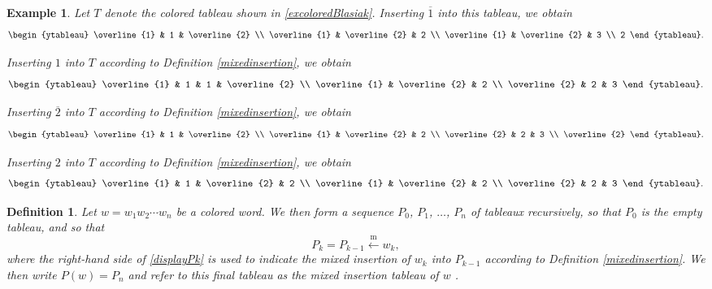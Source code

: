 \documentclass[12pt]{article}
\newtheorem{definition}{Definition}
\newtheorem{example}{Example}
\begin{document}
\begin{example}
 Let $T$ denote the colored tableau shown in \eqref{excoloredBlasiak}. Inserting $\overline{1}$ into this tableau, we obtain 
 $$\begin{ytableau} \overline{1} & 1 & \overline{2} \\ \overline{1} & \overline{2} & 2 \\ \overline{1} & \overline{2} & 3 \\ 2 \end{ytableau}.$$

 Inserting $1$ into $T$ according to Definition \ref{mixedinsertion}, we obtain 
$$\begin{ytableau} \overline{1} & 1 & 1 & \overline{2} \\ \overline{1} & \overline{2} & 2 \\ \overline{2} & 2 & 3 \end{ytableau}.$$

 Inserting $\overline{2}$ 
 into $T$ according to Definition \ref{mixedinsertion}, we obtain 
 $$\begin{ytableau} \overline{1} & 1 & \overline{2} \\ \overline{1} & \overline{2} & 2 \\ \overline{2} & 2 & 3 \\ \overline{2} \end{ytableau}.$$

 Inserting $2$ into $T$ according to Definition \ref{mixedinsertion}, we obtain 
 $$ \begin{ytableau} \overline{1} & 1 & \overline{2} & 2 \\ \overline{1} & \overline{2} & 2 \\ \overline{2} & 2 & 3 \end{ytableau}. $$
\end{example}

\begin{definition}
 Let $w = w_{1} w_{2} \cdots w_{n}$ be a colored word. We then form a sequence $P_{0}$, $P_{1}$, $\ldots$, $P_{n}$ of tableaux recursively, 
 so that $P_{0}$ is the empty tableau, and so that 
\begin{equation}\label{displayPk}
 P_{k} = P_{k-1} \xleftarrow{\operatorname{m}} w_k,
\end{equation}
 where the right-hand side of \eqref{displayPk} is used to indicate the mixed insertion of $w_{k}$ into $P_{k-1}$ according to Definition 
 \ref{mixedinsertion}. We then write $P(w) = P_{n}$ and refer to this final tableau as the \emph{mixed insertion tableau} 
 of $w$ \cite[Definition 2.4]{Blasiak20162018}. 
\end{definition}
\end{document}
